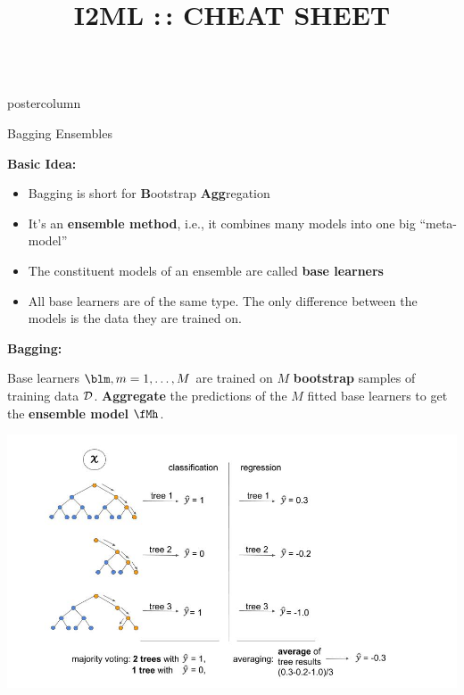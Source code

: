 \documentclass{beamer}
\title{I2ML :\,: CHEAT SHEET} %
\begin{document}
\begin{frame}[fragile]{}
\begin{columns}
	\begin{column}{.31\textwidth}
		\begin{beamercolorbox}[center]{postercolumn}
			\begin{minipage}{.98\textwidth}
				\parbox[t][\columnheight]{\textwidth}{
					\begin{myblock}{Bagging Ensembles}
						\begin{codebox}
			\textbf{Basic Idea:}
						\end{codebox}
						\begin{itemize}[$\bullet$]     
            \setlength{\itemindent}{+.3in}
                        \item Bagging is short for \textbf{B}ootstrap \textbf{Agg}regation
                        \item It's an \textbf{ensemble method}, i.e., it combines many models into one 
        big \enquote{meta-model}
                        \item The constituent models of an ensemble are called \textbf{base learners}
                        \item All base learners are of the same type. The only difference between the models is the data they are trained on.
                        \end{itemize}
				
						\begin{codebox}
			\textbf{Bagging: }
						\end{codebox}
						Base learners $\blm, m = 1, \dots, M$ are trained on $M$ \textbf{bootstrap} samples of training data $\mathcal{D}$. \textbf{Aggregate} the predictions of the $M$ fitted base learners to get the \textbf{ensemble model} $\fMh$.
						
						\includegraphics[width=1.1\columnwidth]{img/img_1.jpg}
						

\end{myblock}}
\end{minipage}
\end{beamercolorbox}
\end{column}
\end{columns}
\end{frame}
\end{document}
